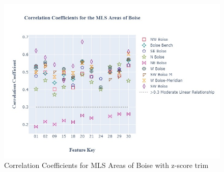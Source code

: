 \documentclass{article}
\begin{document}
\begin{figure}[H]
    \centering
    \includegraphics[width= .7\linewidth]{Ex_Area_fig.jpg}
    \caption{Correlation Coefficients for MLS Areas of Boise with z-score trim}
    \label{fig: area_ccl}
\end{figure}
\end{document}
